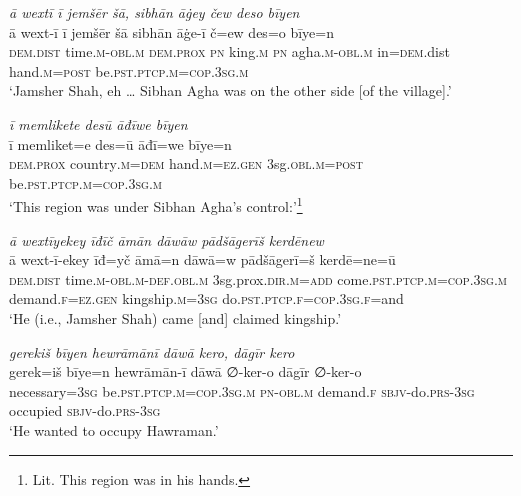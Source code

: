 \ea \label{DP.12}
\textit{ā wextī ī jemšēr šā, sibhān āġey čew deso bīyen} \\ 
\gll ā wext-ī ī jemšēr šā sibhān āġe-ī č=ew des=o bīye=n \\ 
 \textsc{dem.dist} time\textsc{.m}\textsc{-obl}\textsc{.m} \textsc{dem.prox} \textsc{pn} king\textsc{.m} \textsc{pn} agha\textsc{.m}\textsc{-obl}\textsc{.m} in\textsc{=dem}.dist hand\textsc{.m}\textsc{=\textsc{post}} be\textsc{.pst}\textsc{.ptcp}\textsc{.m}\textsc{=cop}\textsc{.3sg}\textsc{.m} \\ 
\glt `Jamsher Shah, eh … Sibhan Agha was on the other side [of the village].'
\z 
 
\ea \label{DP.14}
\textit{ī memlikete desū āđīwe bīyen} \\ 
\gll ī memliket=e des=ū āđī=we bīye=n \\ 
 \textsc{dem.prox} country\textsc{.m}\textsc{=dem} hand\textsc{.m}\textsc{=ez}\textsc{.gen} 3sg\textsc{.obl}\textsc{.m}\textsc{=\textsc{post}} be\textsc{.pst}\textsc{.ptcp}\textsc{.m}\textsc{=cop}\textsc{.3sg}\textsc{.m} \\ 
\glt `This region was under Sibhan Agha’s control:'\footnote{Lit. This region was in his hands.}
\z 
 
\ea \label{DP.17}
\textit{ā wextīyekey īđīč āmān dāwāw pādšāgerīš kerdēnew} \\ 
\gll ā wext-ī-ekey īđ=yč āmā=n dāwā=w pādšāgerī=š kerdē=ne=ū \\ 
 \textsc{dem.dist} time\textsc{.m}\textsc{-obl}\textsc{.m}\textsc{-def}\textsc{.obl}\textsc{.m} 3sg.prox\textsc{.dir}\textsc{.m}\textsc{=add} come\textsc{.pst}\textsc{.ptcp}\textsc{.m}\textsc{=cop}\textsc{.3sg}\textsc{.m} demand\textsc{\textsc{.f}}\textsc{=ez}\textsc{.gen} kingship\textsc{.m}\textsc{=3sg} do\textsc{.pst}\textsc{.ptcp}\textsc{\textsc{.f}}\textsc{=cop}\textsc{.3sg}\textsc{\textsc{.f}}=and \\ 
\glt `He (i.e., Jamsher Shah) came [and] claimed kingship.'
\z 
 
\ea \label{DP.18}
\textit{gerekiš bīyen hewrāmānī dāwā kero, dāgīr kero} \\ 
\gll gerek=iš bīye=n hewrāmān-ī dāwā ∅-ker-o dāgīr ∅-ker-o \\ 
 necessary\textsc{=3sg} be\textsc{.pst}\textsc{.ptcp}\textsc{.m}\textsc{=cop}\textsc{.3sg}\textsc{.m} \textsc{pn}\textsc{-obl}\textsc{.m} demand\textsc{\textsc{.f}} \textsc{sbjv-}do\textsc{.prs}\textsc{-3sg} occupied \textsc{sbjv-}do\textsc{.prs}\textsc{-3sg} \\ 
\glt `He wanted to occupy Hawraman.'
\z 
 
